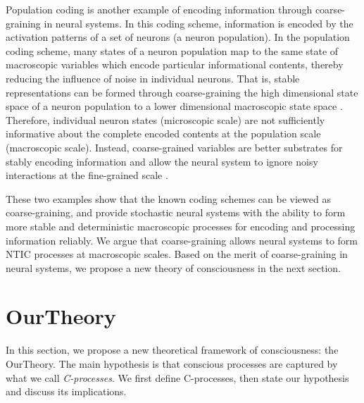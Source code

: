 \documentclass[utf8]{article}
\begin{document}
		Population coding is another example of encoding information through coarse-graining in neural systems. In this coding scheme, information is encoded by the activation patterns of a set of neurons (a neuron population). In the population coding scheme, many states of a neuron population map to the same state of macroscopic variables which encode particular informational contents, thereby reducing the influence of noise in individual neurons. That is, stable representations can be formed through coarse-graining the high dimensional state space of a neuron population to a lower dimensional macroscopic state space \citep{kristan1997population, pouget2000information, binder2009encyclopedia, QuianQuiroga2009}. Therefore, individual neuron states (microscopic scale) are not sufficiently informative about the complete encoded contents at the population scale (macroscopic scale). Instead, coarse-grained variables are better substrates for stably encoding information and allow the neural system to ignore noisy interactions at the fine-grained scale \citep{Woodward2007-WOOCWA}.
		
        These two examples show that the known coding schemes can be viewed as coarse-graining, and provide stochastic neural systems with the ability to form more stable and deterministic macroscopic processes for encoding and processing information reliably. We argue that coarse-graining allows neural systems to form NTIC processes at macroscopic scales. Based on the merit of coarse-graining in neural systems, we propose a new theory of consciousness in the next section. 



	\section{\acl{OurTheory}}\label{sec:OurTheory}
	
        In this section, we propose a new theoretical framework of consciousness: the \acf{OurTheory}. The main hypothesis is that conscious processes are captured by what we call \textit{C-processes}. We first define C-processes, then state our hypothesis and discuss its implications.
        
\end{document}
